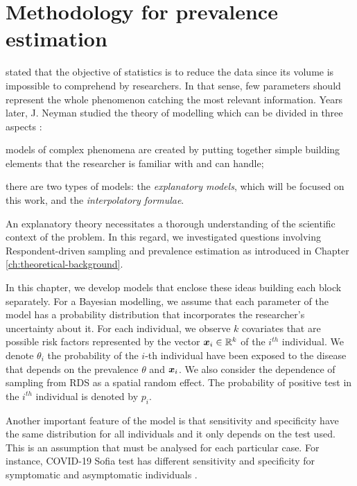 \chapter{Methodology for prevalence estimation}
\label{ch:modelling}

\textcite[p. 311]{fisher1922mathematical} stated that the objective of
statistics is to reduce the data since its volume is impossible
to comprehend by researchers. In that sense, few parameters should represent the whole phenomenon catching the most relevant information.
Years later, J. Neyman studied the theory of modelling which can be divided
in three aspects \cite[p. 161]{lehmann2012model}:

\begin{alineas}
  \item models of complex phenomena are created by putting together
  simple building elements that the researcher is familiar with and can
  handle;
  \item there are two types of models: the \textit{explanatory models},
  which will be focused on this work, and the \textit{interpolatory formulae}.
  \item An explanatory theory necessitates a thorough understanding of the scientific context of the problem. In this regard, we investigated questions involving Respondent-driven sampling and prevalence estimation as introduced in Chapter \ref{ch:theoretical-background}.
\end{alineas}

In this chapter, we develop models that enclose these ideas building each
block separately. For a Bayesian modelling, we assume that each parameter
of the model has a probability distribution that incorporates the
researcher's uncertainty about it. For each individual, we observe $k$
covariates that are possible risk factors represented by the vector
$\boldsymbol{x}_i \in \mathbb{R}^{k}$ of the $i^{th}$ individual. We denote $\theta_i$ the
probability of the $i$-th individual have been exposed to the disease
that depends on the prevalence $\theta$ and $\boldsymbol{x}_i$. We also consider the
dependence of sampling from RDS as a spatial random effect. The probability of
positive test in the $i^{th}$ individual is denoted by $p_i$.

Another important feature of the model is that sensitivity and
specificity have the same distribution for all individuals and
it only depends on the test used. This is an assumption
that must be analysed for each particular case. For instance, COVID-19
Sofia test has different sensitivity and specificity for symptomatic and
asymptomatic individuals \cite[Table 1][p. 3]{mitchell2021performance}.

